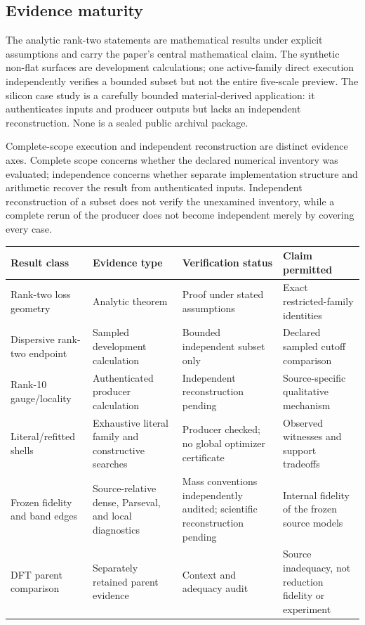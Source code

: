 \documentclass[11pt]{article}
\theoremstyle{definition}
\begin{document}
\subsection{Evidence maturity}

The analytic rank-two statements are mathematical results under explicit assumptions
and carry the paper's central mathematical claim.  The synthetic non-flat surfaces are
development calculations; one active-family direct execution independently verifies a
bounded subset but not the entire five-scale preview.  The silicon case study is a
carefully bounded material-derived application: it authenticates inputs and producer
outputs but lacks an independent reconstruction.  None is a sealed public archival
package.

Complete-scope execution and independent reconstruction are distinct evidence axes.
Complete scope concerns whether the declared numerical inventory was evaluated;
independence concerns whether separate implementation structure and arithmetic recover
the result from authenticated inputs.  Independent reconstruction of a subset does not
verify the unexamined inventory, while a complete rerun of the producer does not become
independent merely by covering every case.

\begin{center}
\small
\begin{tabularx}{\textwidth}{@{}p{}p{}p{}X@{}}
\toprule
Result class & Evidence type & Verification status & Claim permitted\\
\midrule
Rank-two loss geometry & Analytic theorem & Proof under stated assumptions & Exact restricted-family identities\\
Dispersive rank-two endpoint & Sampled development calculation & Bounded independent subset only & Declared sampled cutoff comparison\\
Rank-10 gauge/locality & Authenticated producer calculation & Independent reconstruction pending & Source-specific qualitative mechanism\\
Literal/refitted shells & Exhaustive literal family and constructive searches & Producer checked; no global optimizer certificate & Observed witnesses and support tradeoffs\\
Frozen fidelity and band edges & Source-relative dense, Parseval, and local diagnostics & Mass conventions independently audited; scientific reconstruction pending & Internal fidelity of the frozen source models\\
DFT parent comparison & Separately retained parent evidence & Context and adequacy audit & Source inadequacy, not reduction fidelity or experiment\\
\bottomrule
\end{tabularx}
\end{center}
\normalsize
\end{document}
